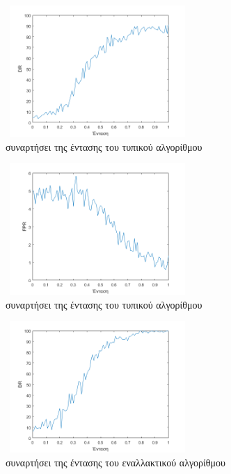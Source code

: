 \begin{figure}[ht!]
\centering
\begin{subfigure}[b]{0.4\textwidth}
 \includegraphics[width=70mm, height=50mm]{../../plots/gr_dr_intensity_semi_sup1.png}
\caption{ συναρτήσει της έντασης του τυπικού αλγορίθμου}
\label{fig:testintdrsemisup1}
\end{subfigure}
\quad
\begin{subfigure}[b]{0.4\textwidth}
\includegraphics[width=70mm, height=50mm]{../../plots/gr_fpr_intensity_semi_sup1.png}
\caption{ συναρτήσει της έντασης του τυπικού αλγορίθμου}
\label{fig:testintfprsemisup1}
\end{subfigure}
\quad
\begin{subfigure}[b]{0.4\textwidth}
 \includegraphics[width=70mm, height=50mm]{../../plots/gr_dr_intensity_semi_sup2.png}
\caption{ συναρτήσει της έντασης του εναλλακτικού αλγορίθμου}
\label{fig:testintdrsemisup2}
\end{subfigure}
\quad
\begin{subfigure}[b]{0.4\textwidth}

\end{subfigure}
\end{figure}
